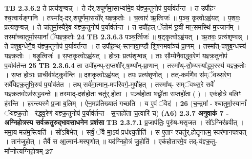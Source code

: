 \documentclass[17pt]{extarticle}
\begin{document}
                  \newline
                                \textbf{ TB 2.3.6.2} \newline
                  ते प्रत्य॑शृण्वन्न् । ते द॑र्.शपूर्णमा॒साभ्या॑मे॒व य॑ज्ञ्क्र॒तुनोप॑ प॒र्याव॑र्तन्त । त उपौ॑हꣳ-श्च॒त्वार्यङ्गा॑नि । तस्मा᳚द्-दर्.शपूर्णमा॒सयो᳚र् यज्ञ्क्र॒तोः । च॒त्वार॑ ऋ॒त्विजः॑ ॥ प॒ञ्च॒ कृत्वोऽह्व॑यत् । प॒शवः॒ प्रत्य॑शृण्वन्न् । ते चा॑तुर्मा॒स्यैरे॒व य॑ज्ञ्क्र॒तुनोप॑ प॒र्याव॑र्तन्त । त उपौ॑ह॒ल् ॅलोम॑ छ॒वीं माꣳ॒॒समस्थि॑ म॒ज्जान᳚म् । तस्मा᳚च्चातुर्मा॒स्यानां᳚ ॅयज्ञ्क्र॒तोः \textbf{ 24} \newline
                  \newline
                                \textbf{ TB 2.3.6.3} \newline
                  पञ्च॒र्त्विजः॑ ॥ ष॒ट्कृत्वोऽह्व॑यत् । ऋ॒तवः॒ प्रत्य॑शृण्वन्न् । ते प॑शुब॒न्धेनै॒व य॑ज्ञ्क्र॒तुनोप॑ प॒र्याव॑र्तन्त । त उपौ॑ह॒न्थ्-स्तना॑वा॒ण्डौ शि॒श्नमवा᳚ञ्चं प्रा॒णम् । तस्मा᳚त्-पशुब॒न्धस्य॑ यज्ञ्क्र॒तोः । षडृ॒त्विजः॑ ॥ स॒प्त॒कृत्वोऽह्व॑यत् । होत्राः॒ प्रत्य॑शृण्वन्न् । ताः सौ॒म्येनै॒वाद्ध्व॒रेण॑ यज्ञ्क्र॒तुनोप॑ प॒र्याव॑र्तन्त \textbf{ 25} \newline
                  \newline
                                \textbf{ TB 2.3.6.4} \newline
                  ता उपौ॑हन्थ्-स॒प्तशी॑र्.ष॒ण्या᳚न्-प्रा॒णान् । तस्मा᳚थ्-सौ॒म्यस्या᳚द्ध्व॒रस्य॑ यज्ञ्क्र॒तोः । स॒प्त होत्राः॒ प्राची॒र्वष॑ट्कुर्वन्ति ॥ द॒श॒कृत्वोऽह्व॑यत् । तपः॒ प्रत्य॑शृणोत् । तत्-कर्म॑णै॒व स॑म्ॅवथ्स॒रेण॒ सर्वै᳚र्यज्ञ्क्र॒तुभि॒रुप॑ प॒र्याव॑र्तत । तथ् सर्व॑मा॒त्मान॒-मप॑रिवर्ग॒-मुपौ॑हत् । तस्मा᳚थ्- सम्ॅवथ्स॒रे सर्वे॑ यज्ञ्क्र॒तवोऽव॑रुद्ध्यन्ते ॥ तस्मा॒द्-दश॑होता॒ चतु॑र्.होता । पञ्च॑होता॒ षड्ढो॑ता स॒प्तहो॑ता ( ) । एक॑होत्रे ब॒लिꣳ ह॑रन्ति । हर॑न्त्यस्मै प्र॒जा ब॒लिम् । ऐन॒मप्र॑तिख्यातं गच्छति । य ए॒वं ॅवेद॑ । \textbf{ 26} \newline
                  \newline
                                    (च॒न्द्रमा᳚ - श्चातुर्मा॒स्यानां᳚ ॅयज्ञ्क्र॒तो - र॑द्ध्व॒रेण॑ यज्ञ्क्र॒तुनोप॑ प॒र्याव॑र्तन्त - स॒प्तहो॑ता च॒त्वारि॑ च) \textbf{(A6)} \newline \newline
                \textbf{ 2.3.7     अनुवाकं   7 - अग्निहोत्रस्य सर्वक्रतुरुद्भावसाधनेन प्रशंसा} \newline
                                \textbf{ TB 2.3.7.1} \newline
                  प्र॒जाप॑तिः॒ पुरु॑ष-मसृजत । सो᳚ऽग्निर॑ब्रवीत् । ममा॒य-मन्न॑म॒स्त्विति॑ । सो॑ऽबिभेत् । सर्वं॒ ॅवै मा॒ऽयं प्रध॑क्ष्य॒तीति॑ । स ए॒ताꣳ-श्चतु॑र्.होतॄनात्म॒-स्पर॑णानपश्यत् । तान॑जुहोत् । तैर्वै स आ॒त्मान॑-मस्पृणोत् ॥ यद॑ग्निहो॒त्रं जु॒होति॑ । एक॑होतारमे॒व तद्-य॑ज्ञ्क्र॒तु-मा᳚प्नोत्यग्निहो॒त्रम् \textbf{ 27} \newline
\end{document}
